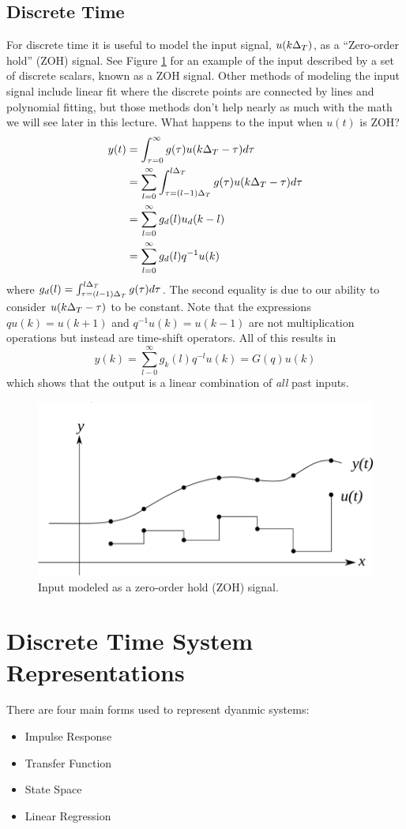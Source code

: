\subsection{Discrete Time}
For discrete time it is useful to model the input signal, $u(k\Delta_T)$, as a ``Zero-order hold'' (ZOH) signal. See Figure \ref{fig:03zoh} for an example of the input described by a set of discrete scalars, known as a ZOH signal. Other methods of modeling the input signal include linear fit where the discrete points are connected by lines and polynomial fitting, but those methods don't help nearly as much with the math we will see later in this lecture. What happens to the input when $u(t)$ is ZOH?
\begin{align*}
y(t) &= \int_{\tau=0}^\infty g(\tau)u(k\Delta_T -\tau)d\tau \\
&= \sum_{l=0}^\infty \int_{\tau=(l-1)\Delta_T}^{l\Delta_T}g(\tau)u(k\Delta_T -\tau)d\tau \\
&= \sum_{l=0}^\infty g_d(l)u_d(k-l) \\
&= \sum_{l=0}^\infty g_d(l)q^{-1}u(k)
\end{align*}
where $g_d(l)=\int_{\tau=(l-1)\Delta_T}^{l\Delta_T}g(\tau)d\tau$. The second equality is due to our ability to consider $u(k\Delta_T -\tau)$ to be constant. Note that the expressions $qu(k) = u(k+1)$ and $q^{-1}u(k)=u(k-1)$ are not multiplication operations but instead are time-shift operators. All of this results in
$$y(k) = \sum_{l-0}^\infty g_k(l)q^{-l}u(k) = G(q)u(k)$$
which shows that the output is a linear combination of \textit{all} past inputs.
\begin{figure}[ht!]
	\centering
	\includegraphics[width=.5\textwidth]{images/03zoh}
	\caption{Input modeled as a zero-order hold (ZOH) signal.}
	\label{fig:03zoh}
\end{figure}

\section{Discrete Time System Representations}
There are four main forms used to represent dyanmic systems:
\begin{itemize}
\item Impulse Response
\item Transfer Function
\item State Space
\item Linear Regression
\end{itemize}

